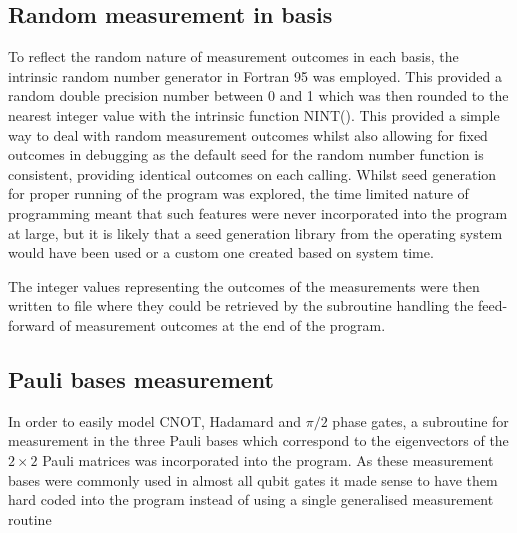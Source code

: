 \subsection{Random measurement in basis}

To reflect the random nature of measurement outcomes in each basis, the intrinsic random number generator in Fortran 95 was employed. This provided a random double precision number between 0 and 1 which was then rounded to the nearest integer value with the intrinsic function NINT(). This provided a simple way to deal with random measurement outcomes whilst also allowing for fixed outcomes in debugging as the default seed for the random number function is consistent, providing identical outcomes on each calling. Whilst seed generation for proper running of the program was explored, the time limited nature of programming meant that such features were never incorporated into the program at large, but it is likely that a seed generation library from the operating system would have been used or a custom one created based on system time.

The integer values representing the outcomes of the measurements were then written to file where they could be retrieved by the subroutine handling the feed-forward of measurement outcomes at the end of the program. 


\subsection{Pauli bases measurement}

In order to easily model CNOT, Hadamard and $\pi/2$ phase gates, a subroutine for measurement in the three Pauli bases which correspond to the eigenvectors of the $2 \times 2$ Pauli matrices was incorporated into the program. As these measurement bases were commonly used in almost all qubit gates it made sense to have them hard coded into the program instead of using a single generalised measurement routine 

